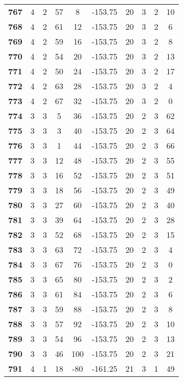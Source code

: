 \documentclass[12pt,letterpaper, onecolumn]{exam}
\begin{document}
\begin{longtable}{cccccccccc}
    \textbf{767} & 4 & 2 & 57 & 8 & -153.75 & 20 & 3 & 2 & 10 \\ 
    \textbf{768} & 4 & 2 & 61 & 12 & -153.75 & 20 & 3 & 2 & 6 \\ 
    \textbf{769} & 4 & 2 & 59 & 16 & -153.75 & 20 & 3 & 2 & 8 \\ 
    \textbf{770} & 4 & 2 & 54 & 20 & -153.75 & 20 & 3 & 2 & 13 \\       \hline
    \textbf{771} & 4 & 2 & 50 & 24 & -153.75 & 20 & 3 & 2 & 17 \\ 
    \textbf{772} & 4 & 2 & 63 & 28 & -153.75 & 20 & 3 & 2 & 4 \\ 
    \textbf{773} & 4 & 2 & 67 & 32 & -153.75 & 20 & 3 & 2 & 0 \\ 
    \textbf{774} & 3 & 3 & 5 & 36 & -153.75 & 20 & 2 & 3 & 62 \\ 
    \textbf{775} & 3 & 3 & 3 & 40 & -153.75 & 20 & 2 & 3 & 64 \\ 
    \textbf{776} & 3 & 3 & 1 & 44 & -153.75 & 20 & 2 & 3 & 66 \\ 
    \textbf{777} & 3 & 3 & 12 & 48 & -153.75 & 20 & 2 & 3 & 55 \\ 
    \textbf{778} & 3 & 3 & 16 & 52 & -153.75 & 20 & 2 & 3 & 51 \\ 
    \textbf{779} & 3 & 3 & 18 & 56 & -153.75 & 20 & 2 & 3 & 49 \\ 
    \textbf{780} & 3 & 3 & 27 & 60 & -153.75 & 20 & 2 & 3 & 40 \\ 
    \textbf{781} & 3 & 3 & 39 & 64 & -153.75 & 20 & 2 & 3 & 28 \\ 
    \textbf{782} & 3 & 3 & 52 & 68 & -153.75 & 20 & 2 & 3 & 15 \\ 
    \textbf{783} & 3 & 3 & 63 & 72 & -153.75 & 20 & 2 & 3 & 4 \\ 
    \textbf{784} & 3 & 3 & 67 & 76 & -153.75 & 20 & 2 & 3 & 0 \\ 
    \textbf{785} & 3 & 3 & 65 & 80 & -153.75 & 20 & 2 & 3 & 2 \\ 
    \textbf{786} & 3 & 3 & 61 & 84 & -153.75 & 20 & 2 & 3 & 6 \\ 
    \textbf{787} & 3 & 3 & 59 & 88 & -153.75 & 20 & 2 & 3 & 8 \\ 
    \textbf{788} & 3 & 3 & 57 & 92 & -153.75 & 20 & 2 & 3 & 10 \\ 
    \textbf{789} & 3 & 3 & 54 & 96 & -153.75 & 20 & 2 & 3 & 13 \\ 
    \textbf{790} & 3 & 3 & 46 & 100 & -153.75 & 20 & 2 & 3 & 21 \\ 
    \textbf{791} & 4 & 1 & 18 & -80 & -161.25 & 21 & 3 & 1 & 49 \\ 

\end{longtable}
\end{document}
